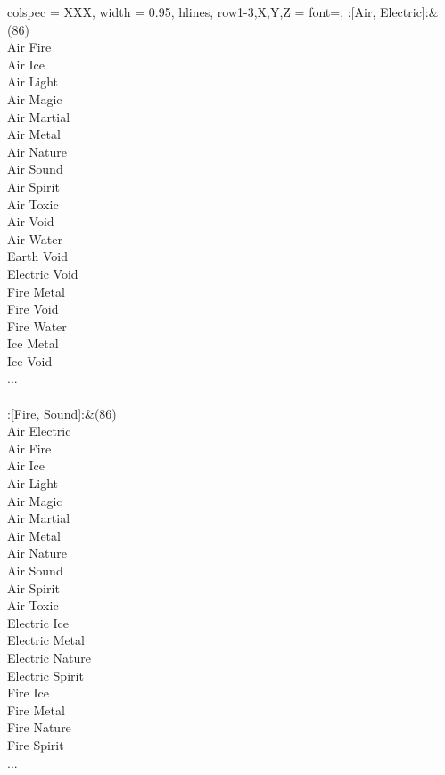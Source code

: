 \begin{longtblr}[
	caption = {2v2 Defending Weak},
	label = {2v2-Defending-Weak},
]{
	colspec = {XXX}, width = 0.95\linewidth,
	hlines,
	row{1-3,X,Y,Z} = {font=\bfseries},
}
	:[Air, Electric]:&{(86)\\
	Air Fire \\
	Air Ice \\
	Air Light \\
	Air Magic \\
	Air Martial \\
	Air Metal \\
	Air Nature \\
	Air Sound \\
	Air Spirit \\
	Air Toxic \\
	Air Void \\
	Air Water \\
	Earth Void \\
	Electric Void \\
	Fire Metal \\
	Fire Void \\
	Fire Water \\
	Ice Metal \\
	Ice Void \\
	...\\
	}\\

	:[Fire, Sound]:&{(86)\\
	Air Electric \\
	Air Fire \\
	Air Ice \\
	Air Light \\
	Air Magic \\
	Air Martial \\
	Air Metal \\
	Air Nature \\
	Air Sound \\
	Air Spirit \\
	Air Toxic \\
	Electric Ice \\
	Electric Metal \\
	Electric Nature \\
	Electric Spirit \\
	Fire Ice \\
	Fire Metal \\
	Fire Nature \\
	Fire Spirit \\
	...\\
	}\\


\end{longtblr}
